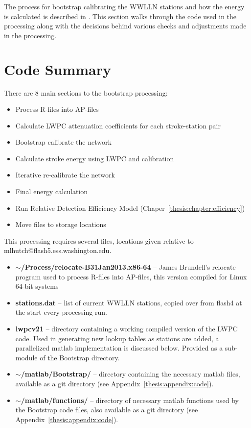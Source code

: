 The process for bootstrap calibrating the WWLLN stations and how the energy is calculated is described in \citet{Hutchins2012}.
This section walks through the code used in the processing along with the decisions behind various checks and adjustments made in the processing.

\section{Code Summary}

There are 8 main sections to the bootstrap processing:

\begin{itemize}
	\item{Process R-files into AP-files}
	\item{Calculate LWPC attenuation coefficients for each stroke-station pair}
	\item{Bootstrap calibrate the network}
	\item{Calculate stroke energy using LWPC and calibration}
	\item{Iterative re-calibrate the network}
	\item{Final energy calculation}
	\item{Run Relative Detection Efficiency Model (Chaper~\ref{thesis:chapter:efficiency})}
	\item{Move files to storage locations}
\end{itemize}

This processing requires several files, locations given relative to mlhutch@flash5.ess.washington.edu.

\begin{itemize}
	\item{\textbf{$\sim$/Process/relocate-B31Jan2013.x86-64} -- James Brundell's relocate program used to process R-files into AP-files, this version compiled for Linux 64-bit systems}
	\item{\textbf{stations.dat} -- list of current WWLLN stations, copied over from flash4 at the start every processing run.}
	\item{\textbf{lwpcv21} -- directory containing a working compiled version of the LWPC code.
		Used in generating new lookup tables as stations are added, a parallelized matlab implementation is discussed below.
		Provided as a sub-module of the Bootstrap directory.}
	\item{\textbf{$\sim$/matlab/Bootstrap/} -- directory containing the necessary matlab files, available as a git directory (see Appendix~\ref{thesis:appendix:code}).}
	\item{\textbf{$\sim$/matlab/functions/} -- directory of necessary matlab functions used by the Bootstrap code files, also available as a git directory (see Appendix~\ref{thesis:appendix:code}).}
\end{itemize}

